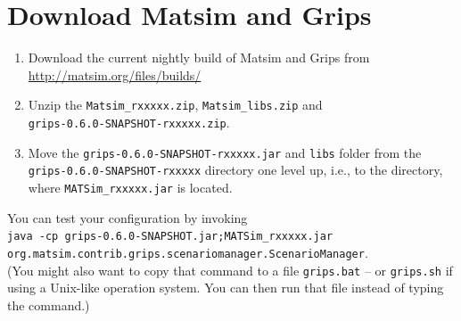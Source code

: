 \section{Download Matsim and Grips}
\begin{enumerate}
\item 
Download the current nightly build of Matsim and Grips from
\url{http://matsim.org/files/builds/}
\item 
Unzip the \verb|Matsim_rxxxxx.zip|, \verb|Matsim_libs.zip| and\\
 \verb|grips-0.6.0-SNAPSHOT-rxxxxx.zip|.
\item 
Move the \verb|grips-0.6.0-SNAPSHOT-rxxxxx.jar| and \verb|libs| folder from the \verb|grips-0.6.0-SNAPSHOT-rxxxxx| directory one level up, 
i.e., to the directory, where \verb|MATSim_rxxxxx.jar| is located.
\end{enumerate}

You can test your configuration by invoking\\ 
\verb|java -cp grips-0.6.0-SNAPSHOT.jar;MATSim_rxxxxx.jar|\\ \verb|org.matsim.contrib.grips.scenariomanager.ScenarioManager|.\\
(You might also want to copy that command to a file \verb|grips.bat| -- or \verb|grips.sh| if using a Unix-like operation system. You can then run that file instead of typing the command.)

